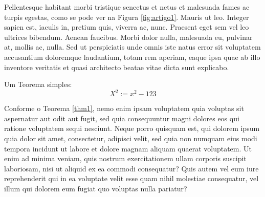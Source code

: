 Pellentesque habitant morbi tristique senectus et netus et malesuada fames ac turpis egestas, como se pode ver na Figura \ref{fig:artigo1}. Mauris ut leo. Integer sapien est, iaculis in, pretium quis, viverra ac, nunc. Praesent eget sem vel leo ultrices bibendum. Aenean faucibus. Morbi dolor nulla, malesuada eu, pulvinar at, mollis ac, nulla. Sed ut perspiciatis unde omnis iste natus error sit voluptatem accusantium doloremque laudantium, totam rem aperiam, eaque ipsa quae ab illo inventore veritatis et quasi architecto beatae vitae dicta sunt explicabo.

%
%
\begin{thm}
Um Teorema simples:
\begin{equation}
X^2 := x^2 - 123
\label{thm1}
\end{equation}
\end{thm}

\lipsum[13] 

%
Conforme o Teorema \ref{thm1}, nemo enim ipsam voluptatem quia voluptas sit aspernatur aut odit aut fugit, sed quia consequuntur magni dolores eos qui ratione voluptatem sequi nesciunt. Neque porro quisquam est, qui dolorem ipsum quia dolor sit amet, consectetur, adipisci velit, sed quia non numquam eius modi tempora incidunt ut labore et dolore magnam aliquam quaerat voluptatem. Ut enim ad minima veniam, quis nostrum exercitationem ullam corporis suscipit laboriosam, nisi ut aliquid ex ea commodi consequatur? Quis autem vel eum iure reprehenderit qui in ea voluptate velit esse quam nihil molestiae consequatur, vel illum qui dolorem eum fugiat quo voluptas nulla pariatur?


